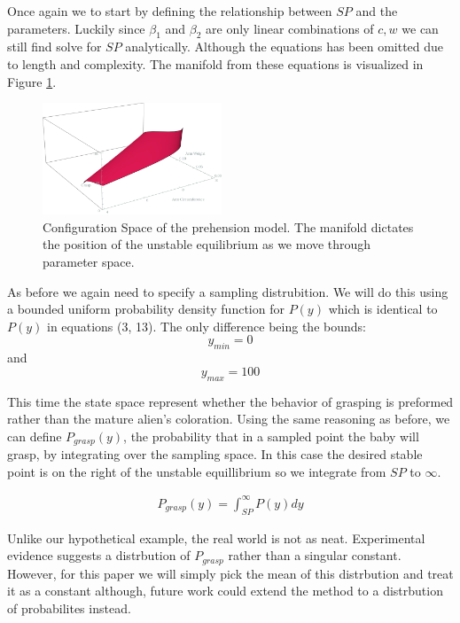 \documentclass[letterpaper]{article}
\begin{document}
Once again we to start by defining the relationship between $SP$ and 
the parameters.
Luckily since $\beta_1$ and $\beta_2$ are only linear combinations 
of $c,w$ we can still
find solve for $SP$ analytically. Although the equations
has been omitted due to length and
complexity. The manifold from these equations is visualized 
in Figure \ref{prehension_saddle}.

\begin{figure}[t]
\begin{center}
\includegraphics[width=2.1in,angle=0]{./saddle_prehension.png}
\caption{Configuration Space of the prehension model. The manifold
dictates the position of the unstable equilibrium as we move through
parameter space.}
\label{prehension_saddle}
\end{center}
\end{figure}

As before we again
need to specify a sampling distrubition. We will do this using a bounded uniform
probability density function for $P(y)$ which is identical to 
$P(y)$ in equations (3, 13). 
The only difference being the bounds:
\[
  y_{min} = 0
  \] 
  and 
  \[y_{max} = 100\]

This time the state space represent whether the behavior of grasping
is preformed rather than the mature alien's
coloration. Using the same reasoning as before, 
we can define $P_{grasp}(y)$, 
the probability
that in a sampled point the baby will grasp, by integrating over the 
sampling space. In this case
the desired stable point is on the right of the unstable equillibrium
so we integrate from $SP$ to $\infty$.

\begin{eqnarray}
    P_{grasp}(y) = \int_{SP}^{\infty}P(y)dy
\end{eqnarray}

Unlike 
our hypothetical example, the real world is not as neat.
Experimental evidence suggests
a distrbution of $P_{grasp}$ rather than a singular constant. However, for this paper
we will simply pick the mean of this distrbution and treat it as a constant although,
future work could extend the method to a distrbution of probabilites instead.
\end{document}
